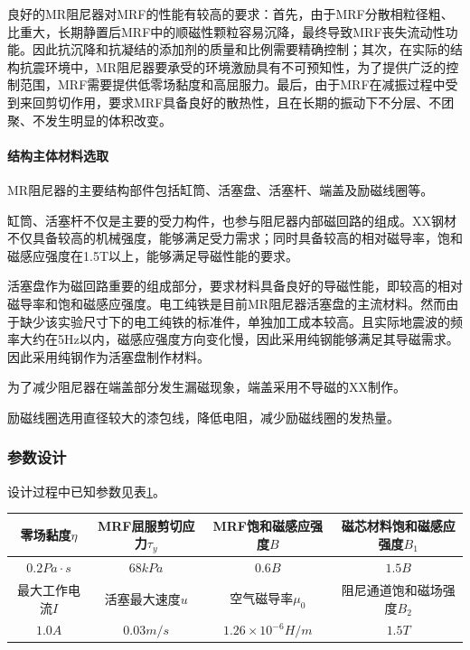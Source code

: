 良好的MR阻尼器对MRF的性能有较高的要求：首先，由于MRF分散相粒径粗、比重大，长期静置后MRF中的顺磁性颗粒容易沉降，最终导致MRF丧失流动性功能。因此抗沉降和抗凝结的添加剂的质量和比例需要精确控制；其次，在实际的结构抗震环境中，MR阻尼器要承受的环境激励具有不可预知性，为了提供广泛的控制范围，MRF需要提供低零场黏度和高屈服力。最后，由于MRF在减振过程中受到来回剪切作用，要求MRF具备良好的散热性，且在长期的振动下不分层、不团聚、不发生明显的体积改变。

\paragraph{结构主体材料选取}

MR阻尼器的主要结构部件包括缸筒、活塞盘、活塞杆、端盖及励磁线圈等。

缸筒、活塞杆不仅是主要的受力构件，也参与阻尼器内部磁回路的组成。XX钢材不仅具备较高的机械强度，能够满足受力需求；同时具备较高的相对磁导率，饱和磁感应强度在1.5T以上，能够满足导磁性能的要求。

活塞盘作为磁回路重要的组成部分，要求材料具备良好的导磁性能，即较高的相对磁导率和饱和磁感应强度。电工纯铁是目前MR阻尼器活塞盘的主流材料。然而由于缺少该实验尺寸下的电工纯铁的标准件，单独加工成本较高。且实际地震波的频率大约在5Hz以内，磁感应强度方向变化慢，因此采用纯钢能够满足其导磁需求。因此采用纯钢作为活塞盘制作材料。

为了减少阻尼器在端盖部分发生漏磁现象，端盖采用不导磁的XX制作。

励磁线圈选用直径较大的漆包线，降低电阻，减少励磁线圈的发热量。

\subsubsection{参数设计}

设计过程中已知参数见表\ref{init}。
\begin{table}[H]
\centering
\label{init}
\footnotesize
\begin{tabular}{|c|c|c|c|}
\hline 零场黏度$\eta$ & MRF屈服剪切应力$\tau_y$ & MRF饱和磁感应强度$B$ & 磁芯材料饱和磁感应强度$B_1$ \\
\hline $0.2Pa\cdot s$ & $68kPa$ & $0.6B$ & $1.5B$ \\
\hline 最大工作电流$I$ & 活塞最大速度$u$ & 空气磁导率$\mu_0$ & 阻尼通道饱和磁场强度$B_2$ \\
\hline $1.0A$ & $0.03m/s$ & $1.26\times10^{-6}H/m$ & $1.5T$ \\
\hline
\end{tabular}
\end{table}



